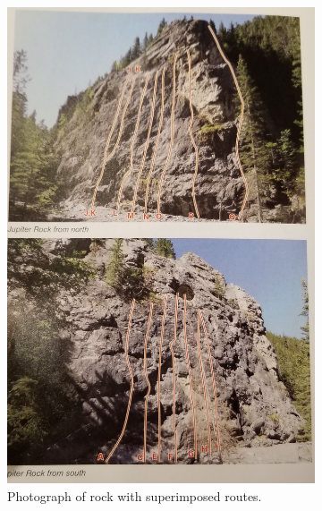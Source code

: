 \documentclass[10pt]{article}
\begin{document}
\begin{figure}[!htb]
  \centering
  \begin{subfigure}[b]{0.3\textwidth}
    \centering
    \includegraphics[width=\textwidth]{juptier_rock_photo.jpg}
    \caption{Photograph of rock with superimposed routes.}
    \label{fig:route_photo}
  \end{subfigure}
  \hfill
  \begin{subfigure}[b]{0.3\textwidth}
    \centering

\end{subfigure}
\end{figure}
\end{document}
